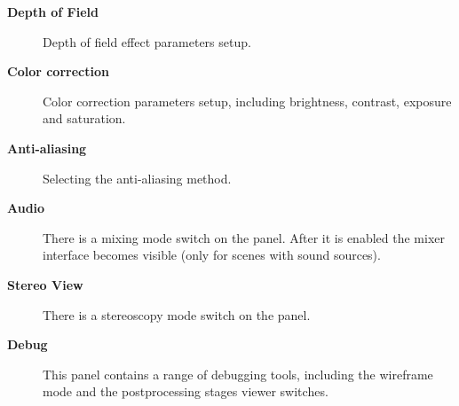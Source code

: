 \documentclass[a4paper,12pt,oneside]{sphinxmanual}
\begin{document}
\begin{description}
\item[{\textbf{Depth of Field}}] \leavevmode
Depth of field effect parameters setup.

\item[{\textbf{Color correction}}] \leavevmode
Color correction parameters setup, including brightness, contrast, exposure and saturation.

\item[{\textbf{Anti-aliasing}}] \leavevmode
Selecting the anti-aliasing method.

\item[{\textbf{Audio}}] \leavevmode
There is a mixing mode switch on the panel. After it is enabled the mixer interface becomes visible (only for scenes with sound sources).

\item[{\textbf{Stereo View}}] \leavevmode
There is a stereoscopy mode switch on the panel.

\item[{\textbf{Debug}}] \leavevmode
This panel contains a range of debugging tools, including the wireframe mode and the postprocessing stages viewer switches.

\end{description}
\end{document}
